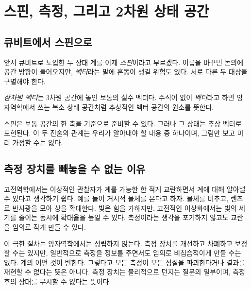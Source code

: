 \chapter{스핀, 측정, 그리고 2차원 상태 공간}


\section{큐비트에서 스핀으로}

앞서 큐비트로 도입한 두 상태 계를 이제 \emph{스핀}이라고 부르겠다. 이름을 바꾸면 논의에 공간 방향이 들어오지만, \emph{벡터}라는 말에 혼동이 생길 위험도 있다. 서로 다른 두 대상을 구별해야 한다.

\begin{definition}
\emph{삼차원 벡터}는 3차원 공간에 놓인 보통의 실수 벡터다. 수식어 없이 \emph{벡터}라고 하면 양자역학에서 쓰는 복소 상태 공간처럼 추상적인 벡터 공간의 원소를 뜻한다.
\end{definition}

스핀은 보통 공간의 한 축을 기준으로 준비할 수 있다. 그러나 그 상태는 추상 벡터로 표현된다. 이 두 진술의 관계는 우리가 알아내야 할 내용 중 하나이며, 그림만 보고 미리 가정할 수는 없다.

\section{측정 장치를 빼놓을 수 없는 이유}

고전역학에서는 이상적인 관찰자가 계를 가능한 한 적게 교란하면서 계에 대해 알아낼 수 있다고 생각하기 쉽다. 예를 들어 거시적 물체를 본다고 하자. 물체를 비추고, 렌즈로 반사광을 모아 상을 확대한다. 빛은 힘을 가하지만, 고전적인 이상화에서는 빛의 세기를 줄이는 동시에 확대율을 높일 수 있다. 측정이라는 생각을 포기하지 않고도 교란을 임의로 작게 만들 수 있다.

이 극한 절차는 양자역학에서는 성립하지 않는다. 측정 장치를 개선하고 차폐하고 보정할 수는 있지만, 일반적으로 측정을 정보를 주면서도 임의로 비침습적이게 만들 수는 없다. 계의 어떤 것이 변한다. 그렇다고 모든 측정이 모든 성질을 파괴한다거나 결과를 재현할 수 없다는 뜻은 아니다. 측정 장치는 물리적으로 던지는 질문의 일부이며, 측정 후의 상태를 무시할 수 없다는 뜻이다.

